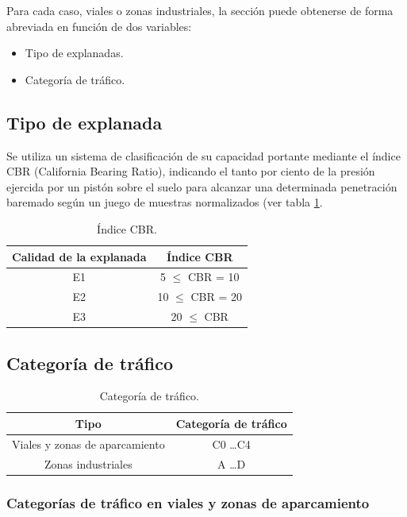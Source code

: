 Para cada caso, viales o zonas industriales, la sección puede obtenerse de forma abreviada en función de dos variables:
\begin{itemize}
\item Tipo de explanadas.
\item Categoría de tráfico.
\end{itemize}

\subsection{Tipo de explanada}

Se utiliza un sistema de clasificación de su capacidad portante mediante el índice CBR (California Bearing Ratio), indicando el tanto por ciento de la presión ejercida por un pistón sobre el suelo para alcanzar una determinada penetración baremado según un juego de muestras normalizados (ver tabla \ref{indicecbr}.

\begin{table}[!htb]
\centering
\begin{tabular}{cc}
\toprule
Calidad de la explanada & Índice CBR\\
\midrule
E1 & 5 $\leq$ CBR = 10\\
E2 & 10 $\leq$ CBR = 20\\
E3 & 20 $\leq$ CBR\\
\bottomrule
\end{tabular}
\caption{Índice CBR.}
\label{indicecbr}
\end{table}


\subsection{Categoría de tráfico}

\begin{table}[!htb]
\centering
\begin{tabular}{cc}
\toprule
Tipo & Categoría de tráfico\\
\midrule
Viales y zonas de aparcamiento & C0 \ldots C4\\
Zonas industriales & A \ldots D\\
\bottomrule
\end{tabular}
\caption{Categoría de tráfico.}
\label{categoriadetrafico}
\end{table}

\subsubsection{Categorías de tráfico en viales y zonas de aparcamiento}

